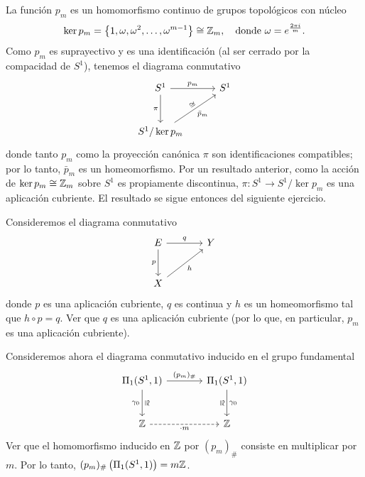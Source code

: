 \begin{dem}
La función $p_m$ es un homomorfismo continuo de grupos topológicos con núcleo
\[
\ker p_m = \left\{ 1, \omega, \omega^2, \dots, \omega^{m-1} \right\} \cong \mathbb{Z}_m, \quad \text{donde } \omega = e^{\frac{2\pi i}{m}}.
\]
Como $p_m$ es suprayectivo y es una identificación (al ser cerrado por la compacidad de $S^1$), tenemos el diagrama conmutativo
\[
\begin{tikzcd}[row sep=1cm, column sep=1cm]
S^1 \arrow[r, "p_m"] \arrow[d, "\pi"'] & S^1 \\
S^1 / \ker p_m \arrow[ur, "\bar{p}_m"', "\cong" sloped] &
\end{tikzcd}
\]
donde tanto $p_m$ como la proyección canónica $\pi$ son identificaciones compatibles; por lo tanto, $\bar{p}_m$ es un homeomorfismo. Por un resultado anterior, como la acción de $\ker p_m \cong \mathbb{Z}_m$ sobre $S^1$ es propiamente discontinua, $\pi \colon S^1 \to S^1 / \ker p_m$ es una aplicación cubriente. El resultado se sigue entonces del siguiente ejercicio.
\end{dem}

\begin{ejercicio}
Consideremos el diagrama conmutativo
\[
\begin{tikzcd}[row sep=large, column sep=large]
E \arrow[r, "q"] \arrow[d, "p"'] & Y \\
X \arrow[ur, "h"'] &
\end{tikzcd}
\]
donde $p$ es una aplicación cubriente, $q$ es continua y $h$ es un homeomorfismo tal que $h \circ p = q$. Ver que $q$ es una aplicación cubriente (por lo que, en particular, $p_m$ es una aplicación cubriente).
\end{ejercicio}


\begin{ejercicio}
Consideremos ahora el diagrama conmutativo inducido en el grupo fundamental
\[
\begin{tikzcd}[row sep=large, column sep=large]
\Pi_1(S^1, 1) \arrow[r, "(p_m)_{\#}"] \arrow[d, "\gamma_0"', "\cong"'{ sloped, pos=0.5, anchor=south }] & \Pi_1(S^1, 1) \arrow[d, "\gamma_0", "\cong"'{ sloped, pos=0.5, anchor=north }] \\
\Z \arrow[r, dashed, "\cdot m"'] & \Z
\end{tikzcd}
\]
Ver que el homomorfismo inducido en $\mathbb{Z}$ por $(p_m)_{\#}$ consiste en multiplicar por $m$. Por lo tanto, $(p_m)_{\#}\left(\Pi_1(S^1, 1)\right) = m\mathbb{Z}$.
\end{ejercicio}

